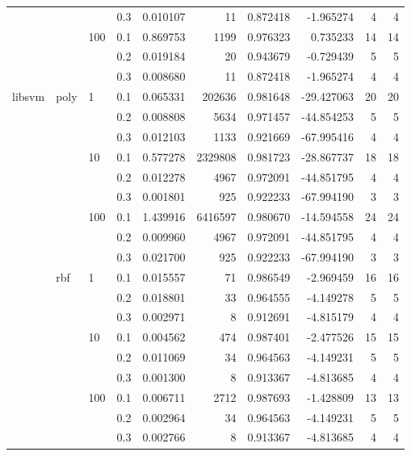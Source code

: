 \begin{table}[H]
\begin{tabular}{llllrrrrrr}
       &     &     & 0.3 &     0.010107 &       11 &  0.872418 &  -1.965274 &           4 &         4 \\
       &     & 100 & 0.1 &     0.869753 &     1199 &  0.976323 &   0.735233 &          14 &        14 \\
       &     &     & 0.2 &     0.019184 &       20 &  0.943679 &  -0.729439 &           5 &         5 \\
       &     &     & 0.3 &     0.008680 &       11 &  0.872418 &  -1.965274 &           4 &         4 \\
libsvm & poly & 1   & 0.1 &     0.065331 &   202636 &  0.981648 & -29.427063 &          20 &        20 \\
       &     &     & 0.2 &     0.008808 &     5634 &  0.971457 & -44.854253 &           5 &         5 \\
       &     &     & 0.3 &     0.012103 &     1133 &  0.921669 & -67.995416 &           4 &         4 \\
       &     & 10  & 0.1 &     0.577278 &  2329808 &  0.981723 & -28.867737 &          18 &        18 \\
       &     &     & 0.2 &     0.012278 &     4967 &  0.972091 & -44.851795 &           4 &         4 \\
       &     &     & 0.3 &     0.001801 &      925 &  0.922233 & -67.994190 &           3 &         3 \\
       &     & 100 & 0.1 &     1.439916 &  6416597 &  0.980670 & -14.594558 &          24 &        24 \\
       &     &     & 0.2 &     0.009960 &     4967 &  0.972091 & -44.851795 &           4 &         4 \\
       &     &     & 0.3 &     0.021700 &      925 &  0.922233 & -67.994190 &           3 &         3 \\
       & rbf & 1   & 0.1 &     0.015557 &       71 &  0.986549 &  -2.969459 &          16 &        16 \\
       &     &     & 0.2 &     0.018801 &       33 &  0.964555 &  -4.149278 &           5 &         5 \\
       &     &     & 0.3 &     0.002971 &        8 &  0.912691 &  -4.815179 &           4 &         4 \\
       &     & 10  & 0.1 &     0.004562 &      474 &  0.987401 &  -2.477526 &          15 &        15 \\
       &     &     & 0.2 &     0.011069 &       34 &  0.964563 &  -4.149231 &           5 &         5 \\
       &     &     & 0.3 &     0.001300 &        8 &  0.913367 &  -4.813685 &           4 &         4 \\
       &     & 100 & 0.1 &     0.006711 &     2712 &  0.987693 &  -1.428809 &          13 &        13 \\
       &     &     & 0.2 &     0.002964 &       34 &  0.964563 &  -4.149231 &           5 &         5 \\
       &     &     & 0.3 &     0.002766 &        8 &  0.913367 &  -4.813685 &           4 &         4 \\
\bottomrule
\end{tabular}
\end{table}
